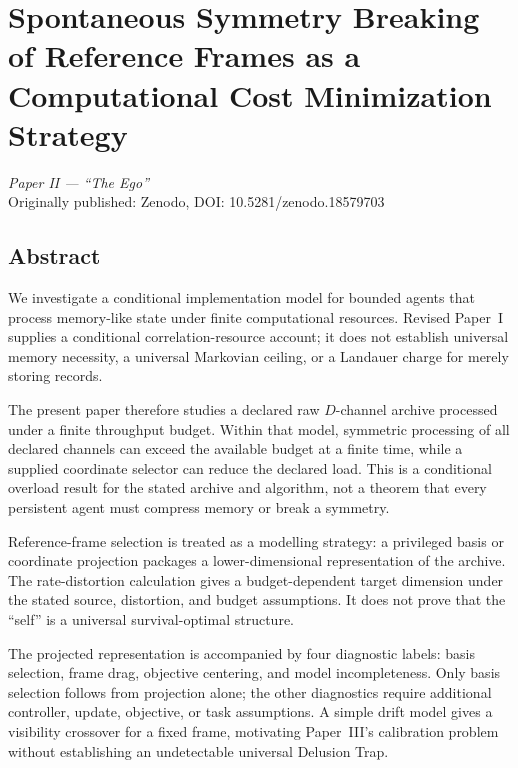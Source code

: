 \documentclass[12pt,a4paper,openany]{book}
\begin{document}

\chapter{Spontaneous Symmetry Breaking of Reference Frames as a Computational Cost Minimization Strategy}
\label{chap:paperII}

\begin{center}
\textit{Paper II --- ``The Ego''}\\[0.5em]
Originally published: Zenodo, DOI: 10.5281/zenodo.18579703
\end{center}

\bigskip

\section*{Abstract}
We investigate a conditional implementation model for bounded agents
that process memory-like state under finite computational resources.
Revised Paper~I~\cite{Liu2026TDOME_I} supplies a conditional
correlation-resource account; it does not establish universal memory
necessity, a universal Markovian ceiling, or a Landauer charge for
merely storing records.

The present paper therefore studies a declared raw $D$-channel archive
processed under a finite throughput budget.  Within that model,
symmetric processing of all declared channels can exceed the available
budget at a finite time, while a supplied coordinate selector can reduce
the declared load.  This is a conditional overload result for the stated
archive and algorithm, not a theorem that every persistent agent must
compress memory or break a symmetry.

Reference-frame selection is treated as a modelling strategy: a
privileged basis or coordinate projection packages a lower-dimensional
representation of the archive.  The rate-distortion calculation gives a
budget-dependent target dimension under the stated source, distortion,
and budget assumptions.  It does not prove that the ``self'' is a
universal survival-optimal structure.

The projected representation is accompanied by four diagnostic labels:
basis selection, frame drag, objective centering, and model
incompleteness.  Only basis selection follows from projection alone; the
other diagnostics require additional controller, update, objective, or
task assumptions.  A simple drift model gives a visibility crossover for
a fixed frame, motivating Paper~III's calibration problem without
establishing an undetectable universal Delusion Trap.
\end{document}
